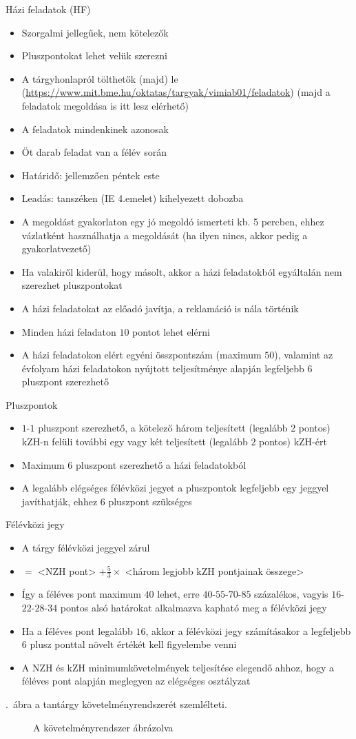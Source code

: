 \documentclass[a4paper,12pt]{article}
\begin{document}
	Házi feladatok (HF)
	\begin{itemize}
		\item Szorgalmi jellegűek, nem kötelezők
		\item Pluszpontokat lehet velük szerezni
		\item A tárgyhonlapról tölthetők (majd) le (\url{https://www.mit.bme.hu/oktatas/targyak/vimiab01/feladatok}) (majd a feladatok megoldása is itt lesz elérhető)
		\item A feladatok mindenkinek azonosak
		\item Öt darab feladat van a félév során
		\item Határidő: jellemzően péntek este
		\item Leadás: tanszéken (IE 4.emelet) kihelyezett dobozba
		\item A megoldást gyakorlaton egy jó megoldó ismerteti kb. 5 percben, ehhez vázlatként használhatja a megoldását (ha ilyen nincs, akkor pedig a gyakorlatvezető)
		\item Ha valakiről kiderül, hogy másolt, akkor a házi feladatokból egyáltalán nem szerezhet pluszpontokat
		\item A házi feladatokat az előadó javítja, a reklamáció is nála történik
		\item Minden házi feladaton $10$ pontot lehet elérni
		\item A házi feladatokon elért egyéni összpontszám (maximum $50$), valamint az évfolyam házi feladatokon nyújtott teljesítménye alapján legfeljebb $6$ pluszpont szerezhető
	\end{itemize}
	Pluszpontok
	\begin{itemize}
		\item $1$-$1$ pluszpont szerezhető, a kötelező három teljesített (legalább $2$ pontos) kZH-n felüli további egy vagy két teljesített (legalább $2$ pontos) kZH-ért
		\item Maximum $6$ pluszpont szerezhető a házi feladatokból
		\item A legalább elégséges félévközi jegyet a pluszpontok legfeljebb egy jeggyel javíthatják, ehhez $6$ pluszpont szükséges
	\end{itemize}
	Félévközi jegy
	\begin{itemize}
		\item A tárgy félévközi jeggyel zárul
		\item <Féléves pont> $=$ <NZH pont> $+\frac{5}{3}\times$ <három legjobb kZH pontjainak összege>
		\item Így a féléves pont maximum $40$ lehet, erre $40$-$55$-$70$-$85$ százalékos, vagyis $16$-$22$-$28$-$34$ pontos alsó határokat alkalmazva kapható meg a félévközi jegy
		\item Ha a féléves pont legalább $16$, akkor a félévközi jegy számításakor a legfeljebb $6$ plusz ponttal növelt értékét kell figyelembe venni
		\item A NZH és kZH minimumkövetelmények teljesítése elegendő ahhoz, hogy a féléves pont alapján meglegyen az elégséges osztályzat
	\end{itemize}
	\Az{\ref{fig:pontrendszer}}.~ábra a tantárgy követelményrendszerét szemlélteti.
	\begin{landscape}
		\begin{figure}[h]
			
			\caption{A követelményrendszer ábrázolva}
			\label{fig:pontrendszer}
		\end{figure}
	\end{landscape}
\end{document}
